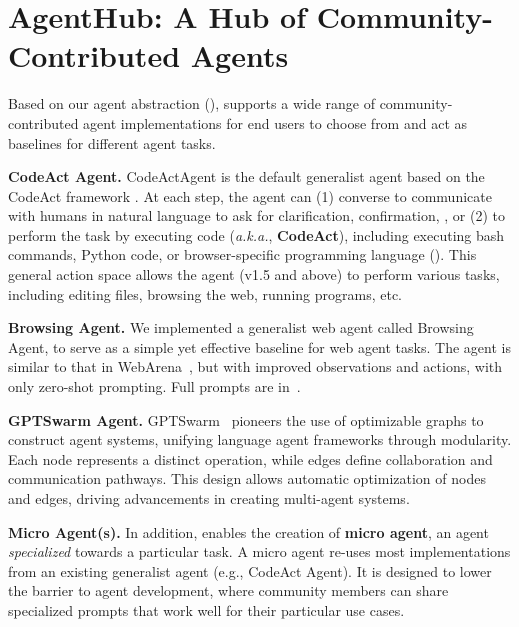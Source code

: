\section{AgentHub: A Hub of Community-Contributed Agents}
\label{sec:agenthub}


Based on our agent abstraction (), \projname supports a wide range of community-contributed agent implementations for end users to choose from and act as baselines for different agent tasks.

\noindent \textbf{CodeAct Agent.} CodeActAgent is the default generalist agent based on the CodeAct framework \citep{wang2024executable}. At each step, the agent can (1) converse to communicate with humans in natural language to ask for clarification, confirmation, \etc, or (2) to perform the task by executing code (\textit{a.k.a.}, \textbf{CodeAct}), including executing bash commands, Python code, or browser-specific programming language (). This general action space allows the agent (v1.5 and above) to perform various tasks, including editing files, browsing the web, running programs, etc.

\noindent \textbf{Browsing Agent.} 
We implemented a generalist web agent called Browsing Agent, to serve as a simple yet effective baseline for web agent tasks.
The agent is similar to that in WebArena~\citep{zhou2023webarena}, but with improved observations and actions, with only zero-shot prompting.
Full prompts are in~. 

\noindent \textbf{GPTSwarm Agent.} 
GPTSwarm~\citep{zhuge2024language} pioneers the use of optimizable graphs to construct agent systems, unifying language agent frameworks through modularity. Each node represents a distinct operation, while edges define collaboration and communication pathways. This design allows automatic optimization of nodes and edges, driving advancements in creating multi-agent systems.



\noindent \textbf{Micro Agent(s).}
In addition, \projname enables the creation of \textbf{micro agent}, an agent \textit{specialized} towards a particular task.
A micro agent re-uses most implementations from an existing generalist agent (e.g., CodeAct Agent). 
It is designed to lower the barrier to agent development, where community members can share specialized prompts that work well for their particular use cases.
